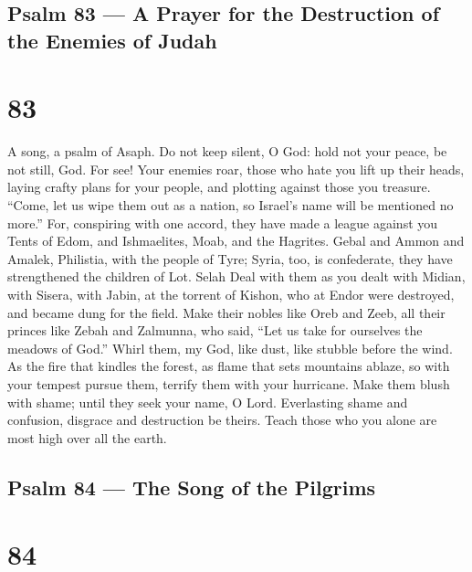 \hypertarget{psalm-83-a-prayer-for-the-destruction-of-the-enemies-of-judah}{%
\subsection{Psalm 83 --- A Prayer for the Destruction of the Enemies of
Judah}\label{psalm-83-a-prayer-for-the-destruction-of-the-enemies-of-judah}}

\hypertarget{section-82}{%
\section{83}\label{section-82}}

A song, a psalm of Asaph.  Do not keep silent, O God: hold
not your peace, be not still, God.  For see! Your enemies
roar, those who hate you lift up their heads,  laying crafty
plans for your people, and plotting against those you treasure.
 ``Come, let us wipe them out as a nation, so Israel's name
will be mentioned no more.''  For, conspiring with one
accord, they have made a league against you  Tents of Edom,
and Ishmaelites, Moab, and the Hagrites.  Gebal and Ammon
and Amalek, Philistia, with the people of Tyre;  Syria, too,
is confederate, they have strengthened the children of Lot. Selah
 Deal with them as you dealt with Midian, with Sisera, with
Jabin, at the torrent of Kishon,  who at Endor were
destroyed, and became dung for the field.  Make their
nobles like Oreb and Zeeb, all their princes like Zebah and Zalmunna,
 who said, ``Let us take for ourselves the meadows of
God.''  Whirl them, my God, like dust, like stubble before
the wind.  As the fire that kindles the forest, as flame
that sets mountains ablaze,  so with your tempest pursue
them, terrify them with your hurricane.  Make them blush
with shame; until they seek your name, O Lord.  Everlasting
shame and confusion, disgrace and destruction be theirs. 
Teach those who you alone are most high over all the earth.

\hypertarget{psalm-84-the-song-of-the-pilgrims}{%
\subsection{Psalm 84 --- The Song of the
Pilgrims}\label{psalm-84-the-song-of-the-pilgrims}}

\hypertarget{section-83}{%
\section{84}\label{section-83}}

